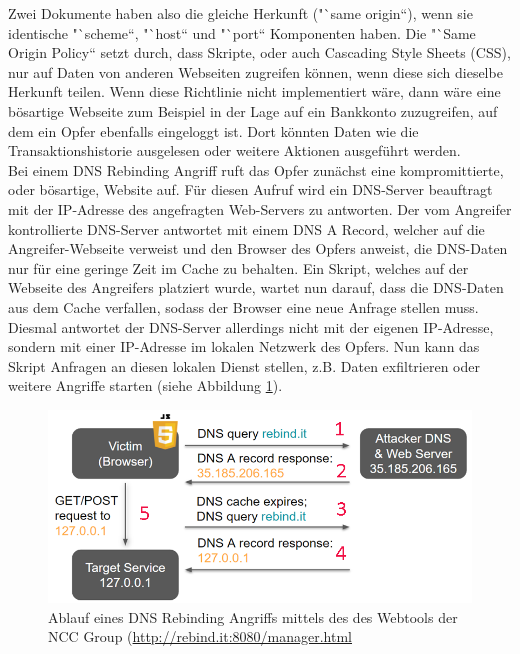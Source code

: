 \documentclass[a4paper]{book}
\begin{document}
\begin{large}
\begin{onehalfspace}
\noindent Zwei Dokumente haben also die gleiche Herkunft ("`same origin“), wenn sie identische "`scheme“, "`host“ und "`port“ Komponenten haben. Die "`Same Origin Policy“ setzt durch, dass Skripte, oder auch Cascading Style Sheets (CSS), nur auf Daten von anderen Webseiten zugreifen können, wenn diese sich dieselbe Herkunft teilen. Wenn diese Richtlinie nicht implementiert wäre, dann wäre eine bösartige Webseite zum Beispiel in der Lage auf ein Bankkonto zuzugreifen, auf dem ein Opfer ebenfalls eingeloggt ist. Dort könnten Daten wie die Transaktionshistorie ausgelesen oder weitere Aktionen ausgeführt werden.	\\ \indent
 	 Bei einem DNS Rebinding Angriff ruft das Opfer zunächst eine kompromittierte, oder bösartige, Website auf. Für diesen Aufruf wird ein DNS-Server beauftragt mit der IP-Adresse des angefragten Web-Servers zu antworten. Der vom Angreifer kontrollierte DNS-Server antwortet mit einem DNS A Record, welcher auf die Angreifer-Webseite verweist und den Browser des Opfers anweist, die DNS-Daten nur für eine geringe Zeit im Cache zu behalten. Ein Skript, welches auf der Webseite des Angreifers platziert wurde, wartet nun darauf, dass die DNS-Daten aus dem Cache verfallen, sodass der Browser eine neue Anfrage stellen muss. Diesmal antwortet der DNS-Server allerdings nicht mit der eigenen IP-Adresse, sondern mit einer IP-Adresse im lokalen Netzwerk des Opfers. Nun kann das Skript Anfragen an diesen lokalen Dienst stellen, z.B. Daten exfiltrieren oder weitere Angriffe starten (siehe Abbildung \ref{fig:DNS Rebinding Angriff}). \\ 

\begin{figure}[ht]
\begin{center}
\includegraphics[scale=0.35]{images/DNS_Rebind_Attack.png} 
\caption{Ablauf eines DNS Rebinding Angriffs mittels des des Webtools der NCC Group (\protect\url{http://rebind.it:8080/manager.html} \cite{GeraldDoussot.2019}}
\label{fig:DNS Rebinding Angriff}
\end{center}
\end{figure}



\end{onehalfspace}
\end{large}
\end{document}
